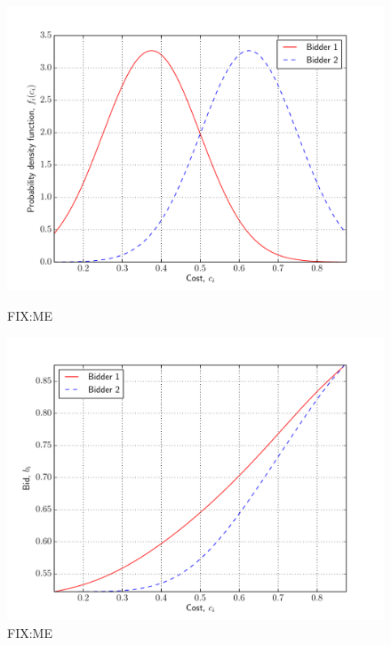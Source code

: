\begin{figure}[p!]
  \includegraphics[width=\figsize]{Approximation/Figures/test_truncated_normal_pdfs}
  \caption{FIX:ME}
  \label{fig:test_truncated_normal_pdfs_approximation}
  \vspace{10mm}
  \includegraphics[width=\figsize]{Approximation/Figures/test_truncated_normal_bids}
  \caption{FIX:ME}
  \label{fig:test_truncated_normal_bids_approximation}
\end{figure}

